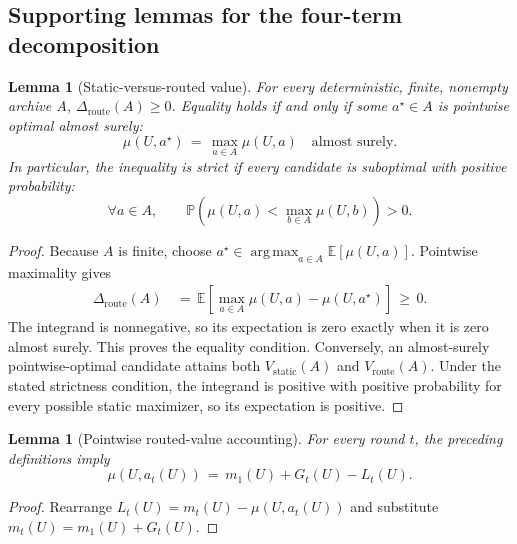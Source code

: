 \documentclass{article} %
\newtheorem{lemma}[theorem]{Lemma}
\begin{document}
\subsection{Supporting lemmas for the four-term decomposition}

\begin{lemma}[Static-versus-routed value]
\label{lem:1}
For every deterministic, finite, nonempty archive \(A\),
\(\Delta_{\mathrm{route}}(A)\geq0\).  Equality holds if and only if some
\(a^\star\in A\) is pointwise optimal almost surely:
\begin{equation}
\mu(U,a^\star)
\,=\,
\max_{a\in A}\mu(U,a)
\quad
\text{almost surely}.
\end{equation}
In particular, the inequality is strict if every candidate is suboptimal with
positive probability:
\begin{equation}
\forall a\in A,
\qquad
\mathbb{P}\!\left(
\mu(U,a)
<
\max_{b\in A}\mu(U,b)
\right)
>
0.
\end{equation}
\end{lemma}

\begin{proof}
Because \(A\) is finite, choose
\(a^\star\in\operatorname*{arg\,max}_{a\in A}
\mathbb E[\mu(U,a)]\).  Pointwise maximality gives
\begin{equation}
\begin{aligned}
\Delta_{\mathrm{route}}(A)
&\,=\,\mathbb E\!\left[
  \max_{a\in A}\mu(U,a)-\mu(U,a^\star)\right]
\,\geq\,0.
\end{aligned}
\end{equation}
The integrand is nonnegative, so its expectation is zero exactly when it is
zero almost surely.  This proves the equality condition.  Conversely, an
almost-surely pointwise-optimal candidate attains both
\(V_{\mathrm{static}}(A)\) and \(V_{\mathrm{route}}(A)\).  Under the stated
strictness condition, the integrand is positive with positive probability for
every possible static maximizer, so its expectation is positive.
\end{proof}

\begin{lemma}[Pointwise routed-value accounting]
\label{lem:2}
For every round \(t\), the preceding definitions imply
\begin{equation}
\mu(U,a_t(U))
\,=\,
m_1(U)+G_t(U)-L_t(U).
\end{equation}
\end{lemma}

\begin{proof}
Rearrange \(L_t(U)=m_t(U)-\mu(U,a_t(U))\) and substitute
\(m_t(U)=m_1(U)+G_t(U)\).
\end{proof}
\end{document}
